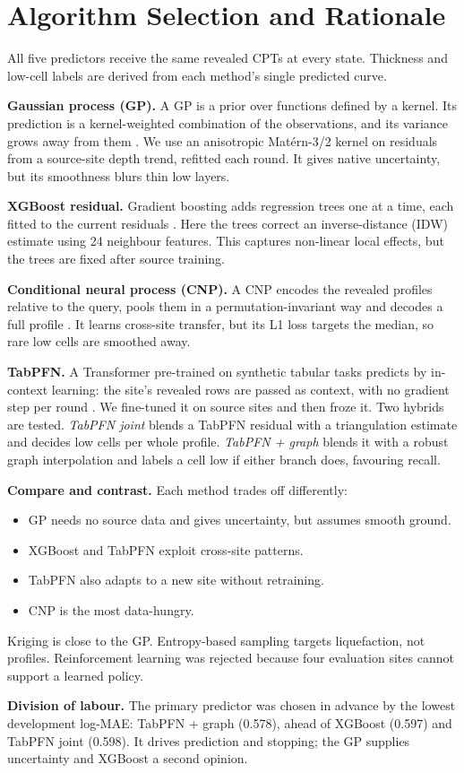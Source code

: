 \section{Algorithm Selection and Rationale}\label{sec:algorithms}

All five predictors receive the same revealed CPTs at every state. Thickness and low-cell labels are derived
from each method's single predicted curve.

\textbf{Gaussian process (GP).} A GP is a prior over functions defined by a kernel. Its prediction is a
kernel-weighted combination of the observations, and its variance grows away from them
\parencite{rasmussen2006gp}. We use an anisotropic Mat\'ern-3/2 kernel on residuals from a source-site depth
trend, refitted each round. It gives native uncertainty, but its smoothness blurs thin low layers.

\textbf{XGBoost residual.} Gradient boosting adds regression trees one at a time, each fitted to the current
residuals \parencite{chen2016xgboost}. Here the trees correct an inverse-distance (IDW) estimate using 24
neighbour features. This captures non-linear local effects, but the trees are fixed after source training.

\textbf{Conditional neural process (CNP).} A CNP encodes the revealed profiles relative to the query, pools
them in a permutation-invariant way and decodes a full profile \parencite{garnelo2018cnp}. It learns
cross-site transfer, but its L1 loss targets the median, so rare low cells are smoothed away.

\textbf{TabPFN.} A Transformer pre-trained on synthetic tabular tasks predicts by in-context learning: the
site's revealed rows are passed as context, with no gradient step per round \parencite{hollmann2025tabpfn}.
We fine-tuned it on source sites and then froze it. Two hybrids are tested. \emph{TabPFN joint} blends a
TabPFN residual with a triangulation estimate and decides low cells per whole profile. \emph{TabPFN + graph}
blends it with a robust graph interpolation and labels a cell low if either branch does, favouring recall.

\textbf{Compare and contrast.} Each method trades off differently:
\begin{itemize}
\item GP needs no source data and gives uncertainty, but assumes smooth ground.
\item XGBoost and TabPFN exploit cross-site patterns.
\item TabPFN also adapts to a new site without retraining.
\item CNP is the most data-hungry.
\end{itemize}
Kriging is close to the GP. Entropy-based sampling \parencite{guan2022adaptive} targets liquefaction, not
\qc{} profiles. Reinforcement learning was rejected because four evaluation sites cannot support a learned
policy.

\textbf{Division of labour.} The primary predictor was chosen in advance by the lowest development
log-MAE: TabPFN + graph (0.578), ahead of XGBoost (0.597) and TabPFN joint (0.598). It drives prediction and
stopping; the GP supplies uncertainty and XGBoost a second opinion.
